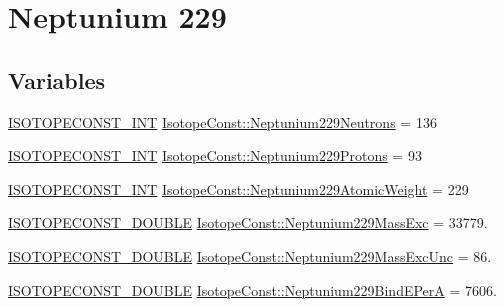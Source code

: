 \hypertarget{group___isotope_const-_neptunium-_np229}{}\section{Neptunium 229}
\label{group___isotope_const-_neptunium-_np229}
\subsection*{Variables}
\begin{DoxyCompactItemize}
\item 
\mbox{\hyperlink{group___isotope_const-_macros_ga5f18360b3e99483a35c32d789e62621c}{I\+S\+O\+T\+O\+P\+E\+C\+O\+N\+S\+T\+\_\+\+I\+NT}} \mbox{\hyperlink{group___isotope_const-_neptunium-_np229_gac96710c75fa88bd1df528a0f51bd1440}{Isotope\+Const\+::\+Neptunium229\+Neutrons}} = 136
\item 
\mbox{\hyperlink{group___isotope_const-_macros_ga5f18360b3e99483a35c32d789e62621c}{I\+S\+O\+T\+O\+P\+E\+C\+O\+N\+S\+T\+\_\+\+I\+NT}} \mbox{\hyperlink{group___isotope_const-_neptunium-_np229_gac617aac0a12a2a2fa26e1b796376c3de}{Isotope\+Const\+::\+Neptunium229\+Protons}} = 93
\item 
\mbox{\hyperlink{group___isotope_const-_macros_ga5f18360b3e99483a35c32d789e62621c}{I\+S\+O\+T\+O\+P\+E\+C\+O\+N\+S\+T\+\_\+\+I\+NT}} \mbox{\hyperlink{group___isotope_const-_neptunium-_np229_ga9a00a6984a7fcaf7c418b62226ea9e95}{Isotope\+Const\+::\+Neptunium229\+Atomic\+Weight}} = 229
\item 
\mbox{\hyperlink{group___isotope_const-_macros_ga8f45a7272ce02c0b4c65c44636ed719a}{I\+S\+O\+T\+O\+P\+E\+C\+O\+N\+S\+T\+\_\+\+D\+O\+U\+B\+LE}} \mbox{\hyperlink{group___isotope_const-_neptunium-_np229_ga38305225c8f1def4037c778d39e4775f}{Isotope\+Const\+::\+Neptunium229\+Mass\+Exc}} = 33779.
\item 
\mbox{\hyperlink{group___isotope_const-_macros_ga8f45a7272ce02c0b4c65c44636ed719a}{I\+S\+O\+T\+O\+P\+E\+C\+O\+N\+S\+T\+\_\+\+D\+O\+U\+B\+LE}} \mbox{\hyperlink{group___isotope_const-_neptunium-_np229_ga87610dbc97117c9c39e72777658258a0}{Isotope\+Const\+::\+Neptunium229\+Mass\+Exc\+Unc}} = 86.
\item 
\mbox{\hyperlink{group___isotope_const-_macros_ga8f45a7272ce02c0b4c65c44636ed719a}{I\+S\+O\+T\+O\+P\+E\+C\+O\+N\+S\+T\+\_\+\+D\+O\+U\+B\+LE}} \mbox{\hyperlink{group___isotope_const-_neptunium-_np229_gaf93a32d6de2721285045d298eda6ccc5}{Isotope\+Const\+::\+Neptunium229\+Bind\+E\+PerA}} = 7606.
\item 

\end{DoxyCompactItemize}
